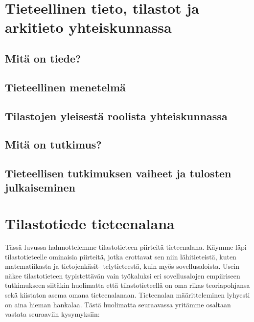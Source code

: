 \documentclass[
]{book}
\begin{document}
\hypertarget{luku2}{%
\chapter{Tieteellinen tieto, tilastot ja arkitieto yhteiskunnassa}\label{luku2}}

\hypertarget{alaluku21}{%
\section{Mitä on tiede?}\label{alaluku21}}

\hypertarget{alaluku22}{%
\section{Tieteellinen menetelmä}\label{alaluku22}}

\hypertarget{alaluku23}{%
\section{Tilastojen yleisestä roolista yhteiskunnassa}\label{alaluku23}}

\hypertarget{alaluku24}{%
\section{Mitä on tutkimus?}\label{alaluku24}}

\hypertarget{alaluku25}{%
\section{Tieteellisen tutkimuksen vaiheet ja tulosten julkaiseminen}\label{alaluku25}}

\hypertarget{tilastotiede-tieteenalana}{%
\chapter{Tilastotiede tieteenalana}\label{tilastotiede-tieteenalana}}

Tässä luvussa hahmottelemme tilastotieteen piirteitä tieteenalana. Käymme läpi tilastotieteelle
ominaisia piirteitä, jotka erottavat sen niin lähitieteistä, kuten matematiikasta ja tietojenkäsit-
telytieteestä, kuin myös sovellusaloista. Usein näkee tilastotieteen typistettävän vain työkaluksi
eri sovellusalojen empiiriseen tutkimukseen siitäkin huolimatta että tilastotieteellä on oma rikas
teoriapohjansa sekä kiistaton asema omana tieteenalanaan.
Tieteenalan määritteleminen lyhyesti on aina hieman hankalaa. Tästä huolimatta seuraavassa
yritämme osaltaan vastata seuraaviin kysymyksiin:
\end{document}
